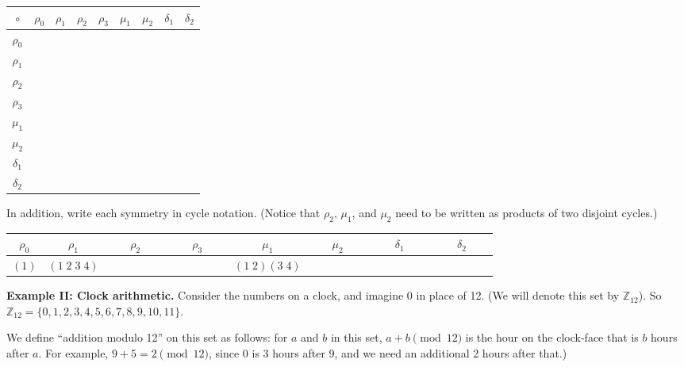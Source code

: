\begin{enumerate}
    \begin{center}
  \renewcommand{\arraystretch}{1.7}
    \begin{tabular}{|c||c|c|c|c|c|c|c|c|} \hline
        $\circ$ & $\rho_0$ & $\rho_1$ & $\rho_2$ & $\rho_3$ & $\mu_1$ & $\mu_2$ & $\delta_1$ & $\delta_2$ \\ \hline \hline
        $\rho_0$ & & & & & & & &   \\ \hline
        $\rho_1$ & & & & & & & &  \\ \hline
        $\rho_2$ & & & & & & & &  \\ \hline
        $\rho_3$ & & & & & & & &  \\ \hline
        $\mu_1$ & & & & & &  & & \\ \hline
        $\mu_2$ & & & & & &  & & \\ \hline
        $\delta_1$ & & & & & &  & & \\ \hline
        $\delta_2$ & & & & & &  & & \\ \hline
    \end{tabular}
    \end{center}
    In addition, write each symmetry in cycle notation. (Notice that $\rho_2$, $\mu_1$, and $\mu_2$ need to be written as products of two disjoint cycles.)
    \begin{center}
   \renewcommand{\arraystretch}{1.7}
    \begin{tabular}{|c|c|c|c|c|c|c|c|} \hline
         $\rho_0$ & $\rho_1$ & $\rho_2$ & $\rho_3$ & $\mu_1$ & $\mu_2$ & $\delta_1$ & $\delta_2$ \\ \hline
         $(1)$ & $(1\; 2\; 3 \; 4)$ & $\phantom{(1\; 2\; 3\; 4)}$
         & $\phantom{(1\; 2\; 3\; 4)}$
         & $(1\; 2)( 3\; 4)$ & $\phantom{(1\; 2\; 3\; 4)}$ & $\phantom{(1\; 2\; 3\; 4)}$
         & $\phantom{(1\; 2\; 3\; 4)}$ \\ \hline
    \end{tabular}
    \end{center}
\end{enumerate}

\clearpage

\textbf{Example II: Clock arithmetic.} Consider the numbers on a clock, and imagine 0 in place of 12. (We will denote this set by $\mathbb{Z}_{12}$). So $\mathbb{Z}_{12} = \{0,1,2,3,4,5,6,7,8,9,10,11\}$.

We define ``addition modulo 12'' on this set as follows: for $a$ and $b$ in this set, $a + b \pmod{12}$ is the hour on the clock-face that is $b$ hours after $a$. For example, $9 + 5 = 2 \pmod{12}$, since 0 is 3 hours after 9, and we need an additional 2 hours after that.)

